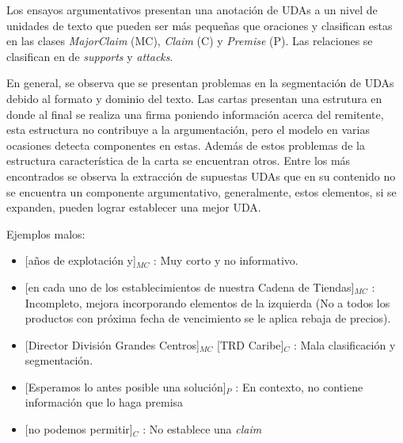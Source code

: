 Los ensayos argumentativos presentan una anotación de UDAs a un nivel de unidades de texto que pueden ser 
más pequeñas que oraciones y clasifican estas en las clases \emph{MajorClaim} (MC), \emph{Claim} (C) y \emph{Premise} 
(P). Las relaciones se clasifican en de \emph{supports} y \emph{attacks}. 

En general, se observa que se presentan problemas en la segmentación de UDAs debido al formato y dominio del texto.
Las cartas presentan una estrutura en donde al final se realiza una firma poniendo información acerca del remitente,
esta estructura no contribuye a la argumentación, pero el modelo en varias ocasiones detecta componentes en estas. 
Además de estos problemas de la estructura característica de la carta se encuentran otros. Entre los más 
encontrados se observa la extracción de supuestas UDAs que en su contenido no se encuentra un componente argumentativo, 
generalmente, estos elementos, si se expanden, pueden lograr establecer una mejor UDA.

Ejemplos malos:
\begin{itemize}
	\item \text{} [años de explotación y]$_{MC}$ 
	: Muy corto y no informativo. %
	\item \text{} [en cada uno de los establecimientos de nuestra Cadena de Tiendas]$_{MC}$ 
	: Incompleto, mejora incorporando elementos de la izquierda (No a todos los productos con próxima fecha de vencimiento se le aplica rebaja de precios). %
	\item \text{} [Director División Grandes Centros]$_{MC}$ [TRD Caribe]$_{C}$ 
	: Mala clasificación y segmentación. %
	\item \text{} [Esperamos lo antes posible una solución]$_{P}$ 
	: En contexto, no contiene información que lo haga premisa %
	\item \text{} [no podemos permitir]$_{C}$ 
	: No establece una \emph{claim} %
\end{itemize}

